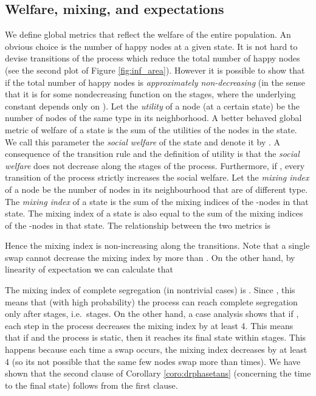 \documentclass[11pt]{article}
\theoremstyle{plain}
\numberwithin{equation}{subsection}
\begin{document}
\subsection{Welfare, mixing, and expectations}
We define
global metrics that reflect the welfare of the entire population. An obvious choice
is the number of happy nodes at a given state. It is not hard to devise 
transitions of the process which reduce the total number of happy nodes 
(see the second plot of Figure \ref{fig:inf_area}).
However it is possible to show that if  the
total number of happy nodes is {\em approximately non-decreasing} (in the sense that it is  for some nondecreasing function  
on the stages, where the underlying constant depends only on ).
Let the {\em utility} of a node (at a certain state) be the number of nodes of the same type in its neighborhood.
A better behaved global metric of welfare 
of a state is the sum of the
utilities of the nodes in the state.
We call this parameter the {\em social welfare} 
of the state and denote it by . 
A consequence of the transition rule and the definition of utility is
 that the {\em social welfare} 
 does not decrease along the stages of the process.
Furthermore, 
if , every transition of the process strictly increases the social welfare.
Let the {\em mixing index} of a node be the number of nodes in its neighbourhood
that are of different type.
The {\em mixing index}  of a state is the sum of the mixing indices
of the -nodes in that state. The mixing index of a state is also equal to the
sum of the mixing indices
of the -nodes in that state.
The relationship between the two metrics is

Hence the mixing index is non-increasing along the transitions.
Note that a single swap cannot decrease the mixing index by more than . On the other hand, 
by linearity of expectation we can calculate that
 
The mixing index of complete segregation (in nontrivial cases) is
.
Since , this means that (with high probability) the process can reach complete segregation only
after  stages, i.e.\  stages. 
On the other hand, a case analysis shows that if , each step in the process
decreases the mixing index by at least 4.
This means that if  and the process is static, then it reaches its final state within 
 stages. 
This happens because each time a swap occurs, the mixing index decreases by at least 4
(so its not possible that the same few nodes swap more than  times).
We have shown that the second clause of Corollary
\ref{coro:drphasetans} (concerning the time to the final state) follows from the first clause.
\end{document}
